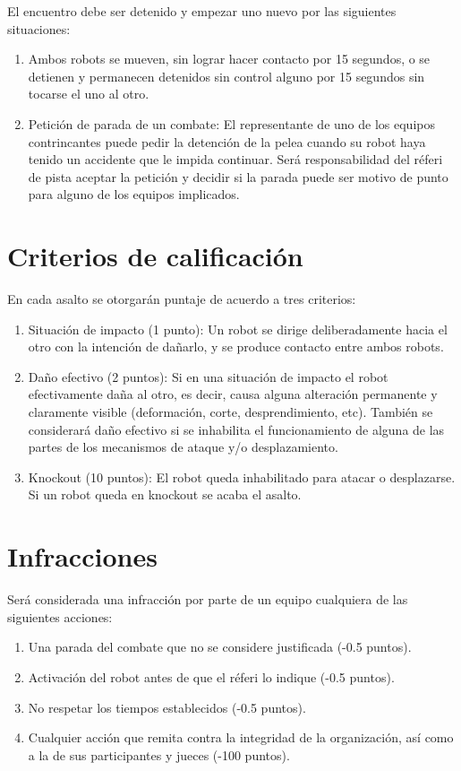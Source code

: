 \documentclass[11pt]{article}
\begin{document}
El encuentro debe ser detenido y empezar uno nuevo por las siguientes situaciones:

\begin{enumerate}
    \item Ambos robots se mueven, sin lograr hacer contacto por 15 segundos, o se detienen y permanecen detenidos sin control alguno por 15 segundos sin tocarse el uno al otro.
    \item Petición de parada de un combate: El representante de uno de los equipos contrincantes puede pedir la detención de la pelea cuando su robot haya tenido un accidente que le impida continuar. Será responsabilidad del réferi de pista aceptar la petición y decidir si la parada puede ser motivo de punto para alguno de los equipos implicados.
\end{enumerate}

\section{Criterios de calificación}\label{subs:cal}
En cada asalto se otorgarán puntaje de acuerdo a tres criterios:
\begin{enumerate}
    \item Situación de impacto (1 punto): Un robot se dirige deliberadamente hacia el otro con la intención de dañarlo, y se produce contacto entre ambos robots.
    \item Daño efectivo (2 puntos): Si en una situación de impacto el robot efectivamente daña al otro, es decir, causa alguna alteración permanente y claramente visible (deformación, corte, desprendimiento, etc). También se considerará daño efectivo si se inhabilita el funcionamiento de alguna de las partes de los mecanismos de ataque y/o desplazamiento.
    \item Knockout (10 puntos): El robot queda inhabilitado para atacar o desplazarse. Si un robot queda en knockout se acaba el asalto.
\end{enumerate}

\section{Infracciones}
Será considerada una infracción por parte de un equipo cualquiera de las siguientes acciones:
\begin{enumerate}
    \item Una parada del combate que no se considere justificada (-0.5 puntos).
    \item Activación del robot antes de que el réferi lo indique (-0.5 puntos).
    \item No respetar los tiempos establecidos (-0.5 puntos).
    \item Cualquier acción que remita contra la integridad de la organización, así como a la de sus participantes y jueces (-100 puntos).
\end{enumerate}
\end{document}
